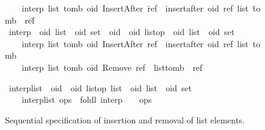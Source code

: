 \begin{figure}
\begin{isabelle}
\begin{tabbing}
\end{tabbing}
\begin{tabbing}
~~~~{\isachardoublequoteopen}interp\ {\isacharparenleft}list{\isacharcomma}\ tomb{\isacharparenright}\ {\isacharparenleft}oid{\isacharcomma}\ InsertAfter\ \=ref{\isacharparenright}\ {\isacharequal}\ {\isacharparenleft}insert{\isacharunderscore}after\ oid\ ref\ list{\isacharcomma}\ \=tomb\ {\isasymunion}\ {\isacharbraceleft}ref{\isacharbraceright}\=\kill
{}\isamarkupfalse%
\ interp\ {\isacharcolon}{\isacharcolon}\ {\isachardoublequoteopen}{\isacharprime}oid\ list\ {\isasymtimes}\ {\isacharprime}oid\ set\ {\isasymRightarrow}\ {\isacharparenleft}{\isacharprime}oid\ {\isasymtimes}\ {\isacharprime}oid\ list{\isacharunderscore}op{\isacharparenright}\ {\isasymRightarrow}\ {\isacharprime}oid\ list\ {\isasymtimes}\ {\isacharprime}oid\ set{\isachardoublequoteclose}\ \\
~~~~{\isachardoublequoteopen}interp\ {\isacharparenleft}list{\isacharcomma}\ tomb{\isacharparenright}\ {\isacharparenleft}oid{\isacharcomma}\ InsertAfter\ \>ref{\isacharparenright}\ {\isacharequal}\ {\isacharparenleft}insert{\isacharunderscore}after\ oid\ ref\ list{\isacharcomma}\ \>tomb\>{\isacharparenright}{\isachardoublequoteclose}\ {\isacharbar}\\
~~~~{\isachardoublequoteopen}interp\ {\isacharparenleft}list{\isacharcomma}\ tomb{\isacharparenright}\ {\isacharparenleft}oid{\isacharcomma}\ Remove\ \>ref{\isacharparenright}\ {\isacharequal}\ {\isacharparenleft}list{\isacharcomma}\>tomb\ {\isasymunion}\ {\isacharbraceleft}ref{\isacharbraceright}\>{\isacharparenright}{\isachardoublequoteclose}
\end{tabbing}
\begin{tabbing}
\isamarkupfalse%
\ interp{\isacharunderscore}list\ {\isacharcolon}{\isacharcolon}\ {\isachardoublequoteopen}{\isacharparenleft}{\isacharprime}oid\ {\isasymtimes}\ {\isacharprime}oid\ list{\isacharunderscore}op{\isacharparenright}\ list\ {\isasymRightarrow}\ {\isacharprime}oid\ list\ {\isasymtimes}\ {\isacharprime}oid\ set{\isachardoublequoteclose}\ \\
~~~~{\isachardoublequoteopen}interp{\isacharunderscore}list\ ops\ {\isasymequiv}\ foldl\ interp\ {\isacharparenleft}{\isacharbrackleft}\ {\isacharbrackright}{\isacharcomma}\ {\isacharbraceleft}{\isacharbraceright}{\isacharparenright}\ ops{\isachardoublequoteclose}
\end{tabbing}
\end{isabelle}
\caption{Sequential specification of insertion and removal of list elements.}\label{fig:isabelle-list-spec}
\end{figure}

